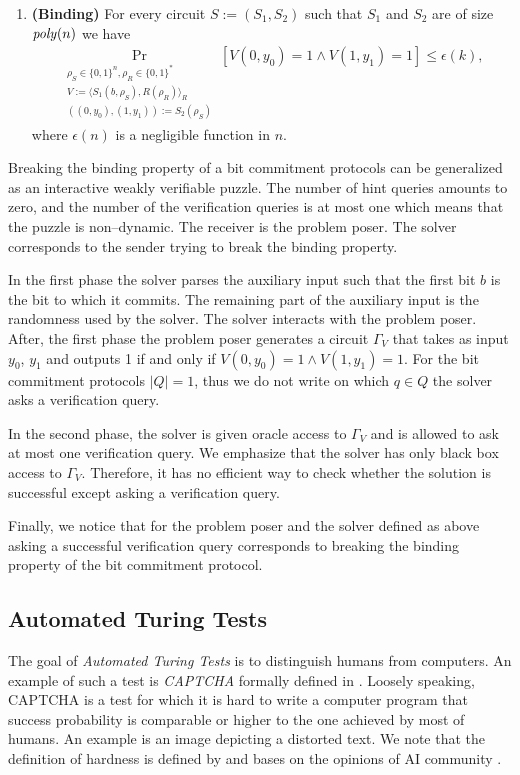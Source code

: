 \begin{definition}
\begin{enumerate}[]
\item{\textnormal{\textbf{(Binding)}}}
  For every circuit $S := (S_1, S_2)$ such that $S_1$ and $S_2$ are of size $\operatorname{\mathit{poly}}(n)$ we have
  \begin{align*}
    \underset{\substack{
        \rho_S \in \{0,1\}^{n}, \rho_R \in \{0,1\}^{*} \\
        V := \langle S_1(b,\rho_S), R(\rho_R) \rangle_{R} \\ ((0, y_0), (1, y_1)) := S_2(\rho_S)}}{\Pr}[V(0,y_0) = 1 \land V(1,y_1) = 1] \leq \epsilon(k),
  \end{align*}
  where $\epsilon(n)$ is a negligible function in $n$.
\end{enumerate}
\end{definition}

Breaking the binding property of a bit commitment protocols can be generalized as an interactive weakly verifiable puzzle.
The number of hint queries amounts to zero, and the number of the verification queries is at most one
which means that the puzzle is non--dynamic.
The receiver is the problem poser. The solver corresponds to the sender trying to break the binding property.

In the first phase the solver parses the auxiliary input such that the first bit $b$ is the bit to which
it commits. The remaining part of the auxiliary input is the randomness used by the solver.
The solver interacts with the problem poser.
After, the first phase the problem poser generates a circuit $\Gamma_V$ that takes as input $y_0$, $y_1$ and outputs
1 if and only if $V(0,y_0) = 1 \land V(1,y_1) = 1$.
For the bit commitment protocols $|Q| = 1$, thus we do not write on which $q \in Q$ the solver asks a verification query.

In the second phase, the solver is given oracle access to $\Gamma_V$ and is allowed to ask at most one verification query.
We emphasize that the solver has only black box access to $\Gamma_V$. Therefore, it has no efficient way to check whether
the solution is successful except asking a verification query.

Finally, we notice that for the problem poser and the solver defined as above asking a successful verification query
corresponds to breaking the binding property of the bit commitment protocol.

\subsection{Automated Turing Tests}
The goal of \textit{Automated Turing Tests} is to distinguish humans from computers.
An example of such a test is \textit{CAPTCHA} formally defined in \cite{von2003captcha}.
Loosely speaking, CAPTCHA is a test for which it is hard to write a computer program that success
probability is comparable or higher to the one achieved by most of humans.
An example is an image depicting a distorted text.
We note that the definition of hardness is defined by and bases on the opinions of AI community \cite{von2003captcha}.

